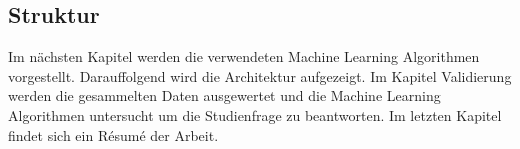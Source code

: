 \subsection{Struktur}
Im nächsten Kapitel werden die verwendeten Machine Learning Algorithmen vorgestellt. Darauffolgend wird die Architektur aufgezeigt. Im Kapitel Validierung werden die gesammelten Daten ausgewertet und die Machine Learning Algorithmen untersucht um die Studienfrage zu beantworten. Im letzten Kapitel findet sich ein Résumé der Arbeit.